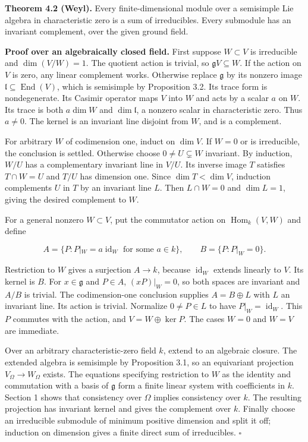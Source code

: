 \documentclass[11pt,a4paper,openany]{report}
\begin{document}
\textbf{Theorem 4.2 (Weyl).} Every finite-dimensional module over a semisimple Lie algebra in characteristic zero is a sum of irreducibles. Every submodule has an invariant complement, over the given ground field.

\textbf{Proof over an algebraically closed field.} First suppose \(W\subset V\) is irreducible and \(\dim(V/W)=1\). The quotient action is trivial, so \(\mathfrak gV\subseteq W\). If the action on \(V\) is zero, any linear complement works. Otherwise replace \(\mathfrak g\) by its nonzero image \(\mathfrak l\subseteq\operatorname{End}(V)\), which is semisimple by Proposition 3.2. Its trace form is nondegenerate. Its Casimir operator maps \(V\) into \(W\) and acts by a scalar \(a\) on \(W\). Its trace is both \(a\dim W\) and \(\dim\mathfrak l\), a nonzero scalar in characteristic zero. Thus \(a\ne0\). The kernel is an invariant line disjoint from \(W\), and is a complement.

For arbitrary \(W\) of codimension one, induct on \(\dim V\). If \(W=0\) or is irreducible, the conclusion is settled. Otherwise choose \(0\ne U\subsetneq W\) invariant. By induction, \(W/U\) has a complementary invariant line in \(V/U\). Its inverse image \(T\) satisfies \(T\cap W=U\) and \(T/U\) has dimension one. Since \(\dim T<\dim V\), induction complements \(U\) in \(T\) by an invariant line \(L\). Then \(L\cap W=0\) and \(\dim L=1\), giving the desired complement to \(W\).

For a general nonzero \(W\subset V\), put the commutator action on \(\operatorname{Hom}_k(V,W)\) and define

\[
A=\{P:P|_W=a\operatorname{id}_W\text{ for some }a\in k\},
\qquad B=\{P:P|_W=0\}.
\tag{4.1}
\]

Restriction to \(W\) gives a surjection \(A\to k\), because \(\operatorname{id}_W\) extends linearly to \(V\). Its kernel is \(B\). For \(x\in\mathfrak g\) and \(P\in A\), \((xP)|_W=0\), so both spaces are invariant and \(A/B\) is trivial. The codimension-one conclusion supplies \(A=B\oplus L\) with \(L\) an invariant line. Its action is trivial. Normalize \(0\ne P\in L\) to have \(P|_W=\operatorname{id}_W\). This \(P\) commutes with the action, and \(V=W\oplus\ker P\). The cases \(W=0\) and \(W=V\) are immediate.

Over an arbitrary characteristic-zero field \(k\), extend to an algebraic closure. The extended algebra is semisimple by Proposition 3.1, so an equivariant projection \(V_{\Omega}\to W_{\Omega}\) exists. The equations specifying restriction to \(W\) as the identity and commutation with a basis of \(\mathfrak g\) form a finite linear system with coefficients in \(k\). Section 1 shows that consistency over \(\Omega\) implies consistency over \(k\). The resulting projection has invariant kernel and gives the complement over \(k\). Finally choose an irreducible submodule of minimum positive dimension and split it off; induction on dimension gives a finite direct sum of irreducibles. \(\square\)
\end{document}
